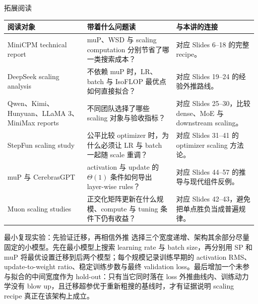 \begin{knowledgebox}{拓展阅读}
\small
\begin{tabular}{L{0.24\textwidth}L{0.34\textwidth}L{0.32\textwidth}}
\toprule
阅读对象 & 带着什么问题读 & 与本讲的连接 \\
\midrule
MiniCPM technical report & muP、WSD 与 scaling computation 分别节省了哪一类搜索成本？ & 对应 Slides 6--18 的完整 recipe。 \\
DeepSeek scaling analysis & 不依赖 muP 时，LR、batch 与 IsoFLOP 最优点如何直接拟合？ & 对应 Slides 19--24 的经验外推路线。 \\
Qwen、Kimi、Hunyuan、LLaMA 3、MiniMax reports & 不同团队选择了哪些 scaling 对象与验收指标？ & 对应 Slides 25--30，比较 dense、MoE 与 downstream scaling。 \\
StepFun scaling study & 公平比较 optimizer 时，为什么必须让 LR 与 batch 一起随 scale 重调？ & 对应 Slides 31--41 的 optimizer scaling 方法论。 \\
muP 与 CerebrasGPT & activation 与 update 的 $\Theta(1)$ 条件如何导出 layer-wise rules？ & 对应 Slides 44--57 的推导与现代组件反例。 \\
Muon scaling studies & 正交化矩阵更新在什么规模、compute 与 tuning 条件下仍有收益？ & 对应 Slides 42--43，避免把单点胜负当成普遍规律。 \\
\bottomrule
\end{tabular}
\end{knowledgebox}

\begin{importantbox}{最小复现实验：先验证迁移，再相信外推}
选择三个宽度递增、架构其余部分尽量固定的小模型。先在最小模型上搜索 learning rate 与 batch size，再分别用 SP 和 muP 将最优设置迁移到后两个模型；每个规模记录训练早期的 activation RMS、update-to-weight ratio、稳定训练步数与最终 validation loss。最后增加一个未参与拟合的中间宽度作为 hold-out：只有当它同时落在 loss 外推曲线内、训练动力学没有 blow up，且迁移超参优于重新粗搜的基线时，才有证据说明 scaling recipe 真正在该架构上成立。
\end{importantbox}



